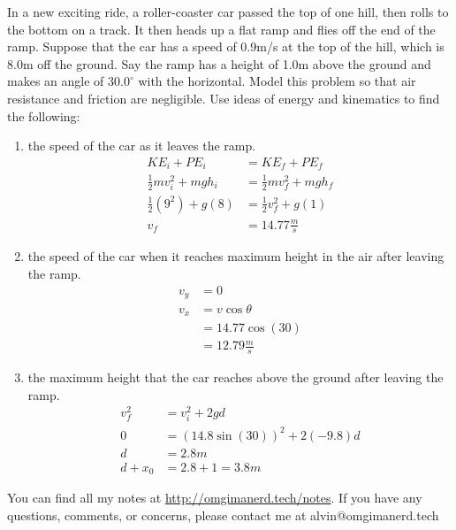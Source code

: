 \documentclass{math}
\begin{document}
In a new exciting ride, a roller-coaster car passed the top of one hill, then
rolls to the bottom on a track. It then heads up a flat ramp and flies off the
end of the ramp. Suppose that the car has a speed of 0.9m/s at the top of the
hill, which is 8.0m off the ground. Say the ramp has a height of 1.0m above the
ground and makes an angle of \( 30.0^{\circ} \) with the horizontal. Model
this problem so that air resistance and friction are negligible. Use ideas of
energy and kinematics to find the following:
\begin{enumerate}
  \item the speed of the car as it leaves the ramp.
  \begin{align*}
    KE_i+PE_i &= KE_f+PE_f \\
    \frac{1}{2}mv_i^2+mgh_i &= \frac{1}{2}mv_f^2+mgh_f \\
    \frac{1}{2}(9^2)+g(8) &= \frac{1}{2}v_f^2+g(1) \\
    v_f &= 14.77\frac{m}{s}
  \end{align*}
  \item the speed of the car when it reaches maximum height in the air after
  leaving the ramp.
  \begin{align*}
    v_y &= 0 \\
    v_x &= v\cos\theta \\
    &= 14.77\cos(30) \\
    &= 12.79\frac{m}{s}
  \end{align*}
  \item the maximum height that the car reaches above the ground after leaving
  the ramp.
  \begin{align*}
    v_f^2 &= v_i^2+2gd \\
    0 &= (14.8\sin(30))^2+2(-9.8)d \\
    d &= 2.8m \\
    d+x_0 &= 2.8+1 = 3.8m
  \end{align*}
\end{enumerate}

\begin{center}
  You can find all my notes at \url{http://omgimanerd.tech/notes}. If you have
  any questions, comments, or concerns, please contact me at
  alvin@omgimanerd.tech
\end{center}
\end{document}
